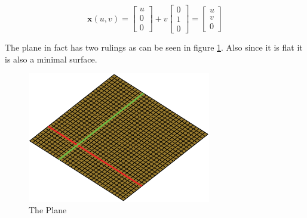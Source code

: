 \begin{example}
\begin{displaymath}
\mathbf x(u,v) =  \left[ \begin{array}{c} u\\0\\0 \end{array} \right] + v\left[ \begin{array}{c} 0\\1\\0 \end{array} \right] = \left[ \begin{array}{c} u\\v\\0 \end{array} \right]
\end{displaymath}

The plane in fact has two rulings as can be seen in figure \ref{fig:plane}. Also since it is flat it is also a minimal surface.

\begin{figure}[htbp]
	\centering
       \includegraphics[width=8cm]{Images/Plane.eps}
   \caption{The Plane}
   \label{fig:plane}
\end{figure} 
\end{example}

